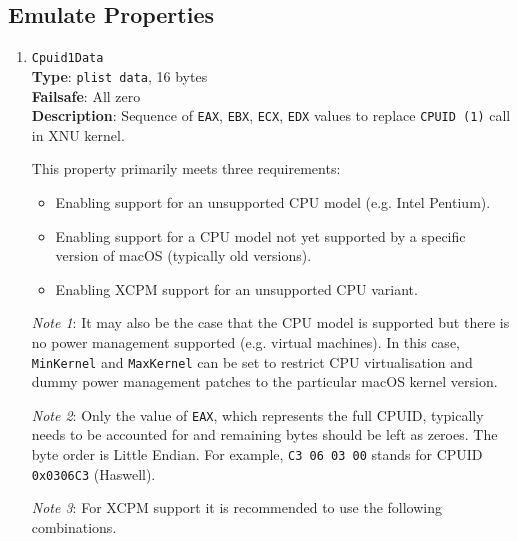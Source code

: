 \documentclass[]{article}
\providecommand{\tightlist}{%
  \setlength{\itemsep}{0pt}\setlength{\parskip}{0pt}}
\begin{document}
\subsection{Emulate Properties}\label{kernelpropsemu}

\begin{enumerate}
\item
  \texttt{Cpuid1Data}\\
  \textbf{Type}: \texttt{plist\ data}, 16 bytes\\
  \textbf{Failsafe}: All zero\\
  \textbf{Description}: Sequence of \texttt{EAX}, \texttt{EBX}, \texttt{ECX},
  \texttt{EDX} values to replace \texttt{CPUID (1)} call in XNU kernel.

  This property primarily meets three requirements:

  \begin{itemize}
    \tightlist
    \item Enabling support for an unsupported CPU model (e.g. Intel Pentium).
    \item Enabling support for a CPU model not yet supported by a specific version of macOS (typically old versions).
    \item Enabling XCPM support for an unsupported CPU variant.
  \end{itemize}

  \emph{Note 1}: It may also be the case that the CPU model is supported but there is no power management supported
  (e.g. virtual machines). In this case, \texttt{MinKernel} and \texttt{MaxKernel} can be set to restrict CPU virtualisation and dummy power
  management patches to the particular macOS kernel version.

  \emph{Note 2}: Only the value of \texttt{EAX}, which represents the full CPUID,
  typically needs to be accounted for and remaining bytes should be left as zeroes.
  The byte order is Little Endian. For example, \texttt{C3 06 03 00} stands for CPUID
  \texttt{0x0306C3} (Haswell).

  \emph{Note 3}: For XCPM support it is recommended to use the following combinations.


\end{enumerate}
\end{document}
